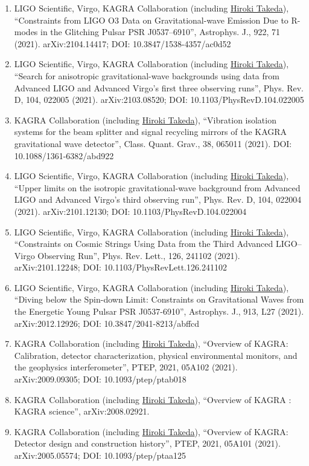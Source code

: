 \documentclass[uplatex, 12pt]{article}
\begin{document}
\begin{enumerate}
\item LIGO Scientific, Virgo, KAGRA Collaboration (including \uline{Hiroki Takeda}), “Constraints from LIGO O3 Data on Gravitational-wave Emission Due to R-modes in the Glitching Pulsar PSR J0537--6910”, Astrophys. J., 922, 71 (2021). arXiv:2104.14417; DOI: 10.3847/1538-4357/ac0d52
\item LIGO Scientific, Virgo, KAGRA Collaboration (including \uline{Hiroki Takeda}), “Search for anisotropic gravitational-wave backgrounds using data from Advanced LIGO and Advanced Virgo's first three observing runs”, Phys. Rev. D, 104, 022005 (2021). arXiv:2103.08520; DOI: 10.1103/PhysRevD.104.022005
\item KAGRA Collaboration (including \uline{Hiroki Takeda}), “Vibration isolation systems for the beam splitter and signal recycling mirrors of the KAGRA gravitational wave detector”, Class. Quant. Grav., 38, 065011 (2021). DOI: 10.1088/1361-6382/abd922
\item LIGO Scientific, Virgo, KAGRA Collaboration (including \uline{Hiroki Takeda}), “Upper limits on the isotropic gravitational-wave background from Advanced LIGO and Advanced Virgo's third observing run”, Phys. Rev. D, 104, 022004 (2021). arXiv:2101.12130; DOI: 10.1103/PhysRevD.104.022004
\item LIGO Scientific, Virgo, KAGRA Collaboration (including \uline{Hiroki Takeda}), “Constraints on Cosmic Strings Using Data from the Third Advanced LIGO--Virgo Observing Run”, Phys. Rev. Lett., 126, 241102 (2021). arXiv:2101.12248; DOI: 10.1103/PhysRevLett.126.241102
\item LIGO Scientific, Virgo, KAGRA Collaboration (including \uline{Hiroki Takeda}), “Diving below the Spin-down Limit: Constraints on Gravitational Waves from the Energetic Young Pulsar PSR J0537-6910”, Astrophys. J., 913, L27 (2021). arXiv:2012.12926; DOI: 10.3847/2041-8213/abffcd
\item KAGRA Collaboration (including \uline{Hiroki Takeda}), “Overview of KAGRA: Calibration, detector characterization, physical environmental monitors, and the geophysics interferometer”, PTEP, 2021, 05A102 (2021). arXiv:2009.09305; DOI: 10.1093/ptep/ptab018
\item KAGRA Collaboration (including \uline{Hiroki Takeda}), “Overview of KAGRA : KAGRA science”, arXiv:2008.02921.
\item KAGRA Collaboration (including \uline{Hiroki Takeda}), “Overview of KAGRA: Detector design and construction history”, PTEP, 2021, 05A101 (2021). arXiv:2005.05574; DOI: 10.1093/ptep/ptaa125

\end{enumerate}
\end{document}
